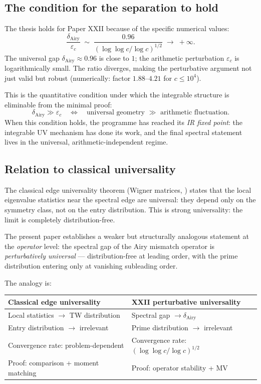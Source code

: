 \documentclass[12pt,a4paper]{amsart}
\begin{document}
\subsection*{The condition for the separation to hold}

The thesis holds for Paper XXII because of the specific numerical values:
\[
  \frac{\delta_{\mathrm{Airy}}}{\varepsilon_c}
  \;\sim\; \frac{0.96}{(\log\log c/\log c)^{1/2}}
  \;\to\; +\infty.
\]
The universal gap $\delta_{\mathrm{Airy}} \approx 0.96$ is close to $1$;
the arithmetic perturbation $\varepsilon_c$ is logarithmically small.
The ratio diverges, making the perturbative argument not just valid
but robust (numerically: factor $1.88$--$4.21$ for $c \le 10^4$).

This is the quantitative condition under which the integrable structure
is eliminable from the minimal proof:
\[
  \boxed{\delta_{\mathrm{Airy}} \gg \varepsilon_c
  \quad\Longleftrightarrow\quad
  \text{universal geometry } \gg \text{ arithmetic fluctuation}.}
\]
When this condition holds, the programme has reached its
\emph{IR fixed point}: the integrable UV mechanism has done its work,
and the final spectral statement lives in the universal,
arithmetic-independent regime.

\subsection*{Relation to classical universality}

The classical edge universality theorem (Wigner matrices, \cite{ESY2009})
states that the local eigenvalue statistics near the spectral edge
are universal: they depend only on the symmetry class, not on the
entry distribution.
This is strong universality: the limit is completely distribution-free.

The present paper establishes a weaker but structurally analogous statement
at the \emph{operator} level:
the spectral gap of the Airy mismatch operator is
\emph{perturbatively universal} --- distribution-free at leading order,
with the prime distribution entering only at vanishing subleading order.

The analogy is:
\begin{center}
\begin{tabular}{ll}
\toprule
Classical edge universality & XXII perturbative universality\\
\midrule
Local statistics $\to$ TW distribution & Spectral gap $\to \delta_{\mathrm{Airy}}$\\
Entry distribution $\to$ irrelevant & Prime distribution $\to$ irrelevant\\
Convergence rate: problem-dependent & Convergence rate: $(\log\log c/\log c)^{1/2}$\\
Proof: comparison + moment matching & Proof: operator stability + MV\\
\bottomrule
\end{tabular}
\end{center}
\end{document}
